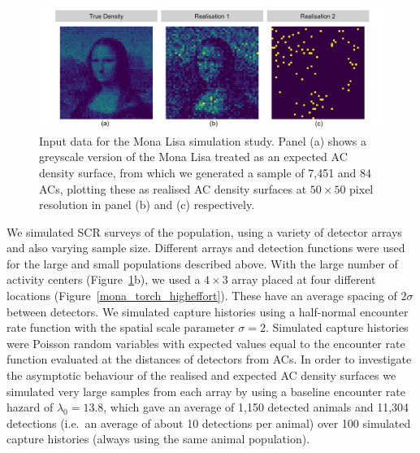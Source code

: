 \documentclass[10pt,a4paper]{article}
\begin{document}

\begin{figure}[htbp]
\centering
\includegraphics[width=1\textwidth]{mona_inputdata.png}
\caption{Input data for the Mona Lisa simulation study. Panel (a) shows a greyscale version of the Mona Lisa treated as an expected AC density surface, from which we generated a sample of 7,451 and 84 ACs, plotting these as realised AC density surfaces at $50\times 50$ pixel resolution in panel (b) and (c) respectively.}
\label{mlinputs}
\end{figure}

We simulated SCR surveys of the population, using a variety of detector arrays and also varying sample size. Different arrays and detection functions were used for the large and small populations described above. With the large number of activity centers (Figure~\ref{mlinputs}b), we used a $4\times 3$ array placed at four different locations (Figure~\ref{mona_torch_higheffort}). These have an average spacing of $2\sigma$ between detectors. We simulated capture histories using a half-normal encounter rate function with the spatial scale parameter $\sigma=2$. Simulated capture histories were Poisson random variables with expected values equal to the encounter rate function evaluated at the distances of detectors from ACs. In order to investigate the asymptotic behaviour of the realised and expected AC density surfaces we simulated very large samples from each array by using a baseline encounter rate hazard of $\lambda_0=13.8$, which gave an average of 1,150 detected animals and 11,304 detections (i.e.\ an average of about 10 detections per animal) over 100 simulated capture histories (always using the same animal population). 
\end{document}
